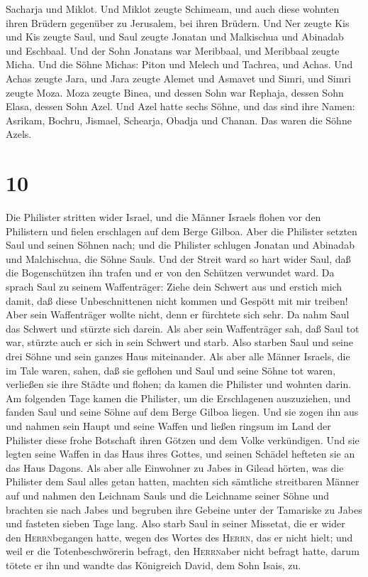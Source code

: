 Sacharja und Miklot.  Und Miklot zeugte Schimeam, und
auch diese wohnten ihren Brüdern gegenüber zu Jerusalem, bei ihren
Brüdern.  Und Ner zeugte Kis und Kis zeugte Saul, und
Saul zeugte Jonatan und Malkischua und Abinadab und Eschbaal.
 Und der Sohn Jonatans war Meribbaal, und Meribbaal
zeugte Micha.  Und die Söhne Michas: Piton und Melech und
Tachrea, und Achas.  Und Achas zeugte Jara, und Jara
zeugte Alemet und Asmavet und Simri, und Simri zeugte Moza.
 Moza zeugte Binea, und dessen Sohn war Rephaja, dessen
Sohn Elasa, dessen Sohn Azel.  Und Azel hatte sechs
Söhne, und das sind ihre Namen: Asrikam, Bochru, Jismael, Schearja,
Obadja und Chanan. Das waren die Söhne Azels.

\hypertarget{section-9}{%
\section{10}\label{section-9}}

 Die Philister stritten wider Israel, und die Männer
Israels flohen vor den Philistern und fielen erschlagen auf dem Berge
Gilboa.  Aber die Philister setzten Saul und seinen Söhnen
nach; und die Philister schlugen Jonatan und Abinadab und Malchischua,
die Söhne Sauls.  Und der Streit ward so hart wider Saul,
daß die Bogenschützen ihn trafen und er von den Schützen verwundet ward.
 Da sprach Saul zu seinem Waffenträger: Ziehe dein Schwert
aus und erstich mich damit, daß diese Unbeschnittenen nicht kommen und
Gespött mit mir treiben! Aber sein Waffenträger wollte nicht, denn er
fürchtete sich sehr. Da nahm Saul das Schwert und stürzte sich darein.
 Als aber sein Waffenträger sah, daß Saul tot war, stürzte
auch er sich in sein Schwert und starb.  Also starben Saul
und seine drei Söhne und sein ganzes Haus miteinander. 
Als aber alle Männer Israels, die im Tale waren, sahen, daß sie geflohen
und Saul und seine Söhne tot waren, verließen sie ihre Städte und
flohen; da kamen die Philister und wohnten darin.  Am
folgenden Tage kamen die Philister, um die Erschlagenen auszuziehen, und
fanden Saul und seine Söhne auf dem Berge Gilboa liegen. 
Und sie zogen ihn aus und nahmen sein Haupt und seine Waffen und ließen
ringsum im Land der Philister diese frohe Botschaft ihren Götzen und dem
Volke verkündigen.  Und sie legten seine Waffen in das
Haus ihres Gottes, und seinen Schädel hefteten sie an das Haus Dagons.
 Als aber alle Einwohner zu Jabes in Gilead hörten, was
die Philister dem Saul alles getan hatten,  machten sich
sämtliche streitbaren Männer auf und nahmen den Leichnam Sauls und die
Leichname seiner Söhne und brachten sie nach Jabes und begruben ihre
Gebeine unter der Tamariske zu Jabes und fasteten sieben Tage lang.
 Also starb Saul in seiner Missetat, die er wider den
\textsc{Herrn}begangen hatte, wegen des Wortes des \textsc{Herrn}, das
er nicht hielt; und weil er die Totenbeschwörerin befragt,
 den \textsc{Herrn}aber nicht befragt hatte, darum tötete
er ihn und wandte das Königreich David, dem Sohn Isais, zu.

